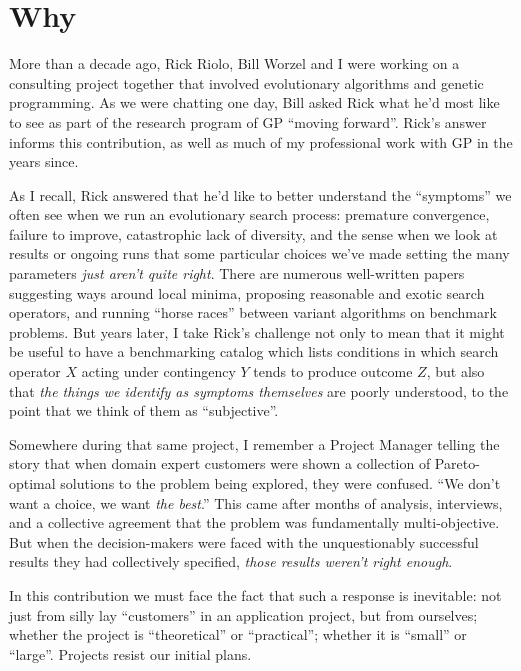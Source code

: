 
\section{Why}\hypertarget{why}{}\label{why}

More than a decade ago, Rick Riolo, Bill Worzel and I were working on a consulting project together that involved evolutionary algorithms and genetic programming. As we were chatting one day, Bill asked Rick what he'd most like to see as part of the research program of GP ``moving forward''. Rick's answer informs this contribution, as well as much of my professional work with GP in the years since.

As I recall, Rick answered that he'd like to better understand the ``symptoms'' we often see when we run an evolutionary search process: premature convergence, failure to improve, catastrophic lack of diversity, and the sense when we look at results or ongoing runs that some particular choices we've made setting the many parameters \emph{just aren't quite right}. There are numerous well-written papers suggesting ways around local minima, proposing reasonable and exotic search operators, and running ``horse races'' between variant algorithms on benchmark problems. But years later, I take Rick's challenge not only to mean that it might be useful to have a benchmarking catalog which lists conditions in which search operator $X$ acting under contingency $Y$ tends to produce outcome $Z$, but also that \emph{the things we identify as symptoms themselves} are poorly understood, to the point that we think of them as ``subjective''.

Somewhere during that same project, I remember a Project Manager telling the story that when domain expert customers were shown a collection of Pareto-optimal solutions to the problem being explored, they were confused. ``We don't want a choice, we want \emph{the best}.'' This came after months of analysis, interviews, and a collective agreement that the problem was fundamentally multi-objective. But when the decision-makers were faced with the unquestionably successful results they had collectively specified, \emph{those results weren't right enough}.

In this contribution we must face the fact that such a response is inevitable: not just from silly lay ``customers'' in an application project, but from ourselves; whether the project is ``theoretical'' or ``practical''; whether it is ``small'' or ``large''. Projects resist our initial plans.

